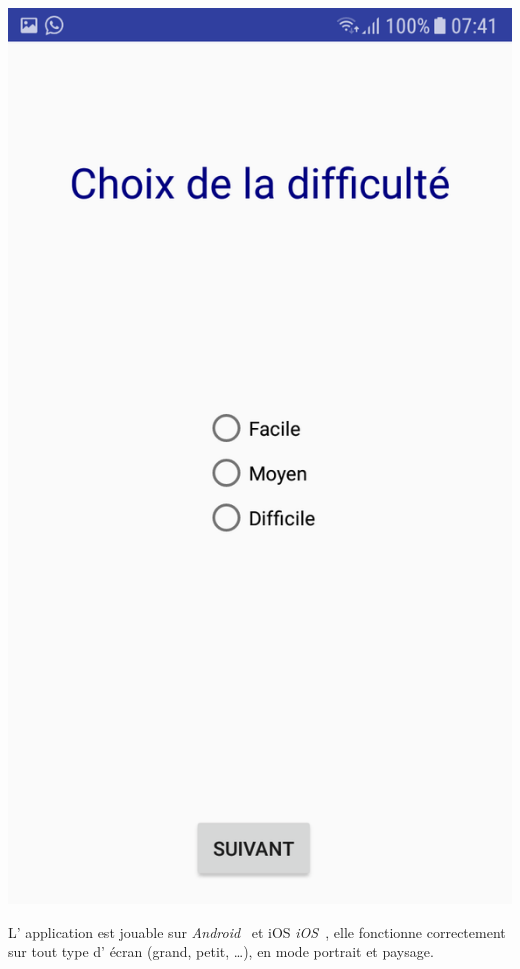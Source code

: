 \documentclass{article}
\begin{document}
\begin{center}
  \includegraphics[scale=0.12]{Difficulte.png}
\end{center}

L' application est jouable sur \textit{Android}~\cite{androidDoc} et iOS \textit{iOS}~\cite{iosDoc}, elle fonctionne correctement sur tout type d' \'ecran (grand, petit, …), en mode portrait et paysage.\\




\end{document}
